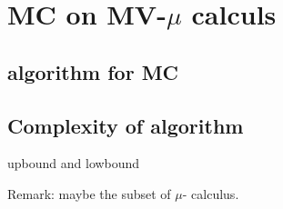 \section{MC on MV-$\mu$ calculs }

\subsection{algorithm for MC }
\subsection{Complexity of algorithm}
 upbound and lowbound

Remark: maybe the subset of $\mu$- calculus. 